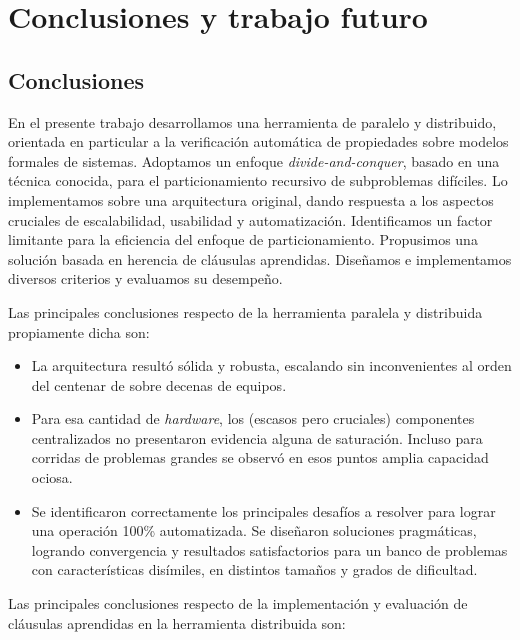 \chapter{Conclusiones y trabajo futuro}
\label{conclu}


\section{Conclusiones}

En el presente trabajo desarrollamos una herramienta de \ssolving paralelo y distribuido, orientada en particular a la verificación automática de propiedades sobre modelos formales de sistemas. Adoptamos un enfoque \emph{divide-and-conquer}, basado en una técnica conocida, para el particionamiento recursivo de subproblemas difíciles. Lo implementamos sobre una arquitectura original, dando respuesta a los aspectos cruciales de escalabilidad, usabilidad y automatización. Identificamos un factor limitante para la eficiencia del enfoque de particionamiento. Propusimos una solución basada en herencia de cláusulas aprendidas. Diseñamos e implementamos diversos criterios y evaluamos su desempeño.

\medskip

Las principales conclusiones respecto de la herramienta paralela y distribuida propiamente dicha son:

\begin{itemize}

\item La arquitectura resultó sólida y robusta, escalando sin inconvenientes al orden del centenar de \ws sobre decenas de equipos.

\item Para esa cantidad de \emph{hardware}, los (escasos pero cruciales) componentes centralizados no presentaron evidencia alguna de saturación. Incluso para corridas de problemas grandes se observó en esos puntos amplia capacidad ociosa.

\item Se identificaron correctamente los principales desafíos a resolver para lograr una operación 100\% automatizada. Se diseñaron soluciones pragmáticas, logrando convergencia y resultados satisfactorios para un banco de problemas con características disímiles, en distintos tamaños y grados de dificultad.

\end{itemize}



Las principales conclusiones respecto de la implementación y evaluación de cláusulas aprendidas en la herramienta distribuida son:

